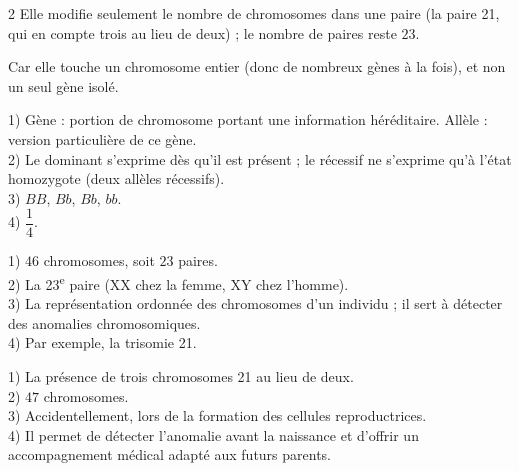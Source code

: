 \begin{multicols}{2}
Elle modifie seulement le nombre de chromosomes dans une paire (la paire 21, qui en
compte trois au lieu de deux) ; le nombre de paires reste $23$.

Car elle touche un chromosome entier (donc de nombreux gènes à la fois), et non un seul
gène isolé.

1) Gène : portion de chromosome portant une information héréditaire. Allèle : version
particulière de ce gène.\\
2) Le dominant s'exprime dès qu'il est présent ; le récessif ne s'exprime qu'à l'état
homozygote (deux allèles récessifs).\\
3) $BB$, $Bb$, $Bb$, $bb$.\\
4) $\dfrac14$.

1) $46$ chromosomes, soit $23$ paires.\\
2) La 23\textsuperscript{e} paire (XX chez la femme, XY chez l'homme).\\
3) La représentation ordonnée des chromosomes d'un individu ; il sert à détecter des
anomalies chromosomiques.\\
4) Par exemple, la trisomie 21.

1) La présence de trois chromosomes 21 au lieu de deux.\\
2) $47$ chromosomes.\\
3) Accidentellement, lors de la formation des cellules reproductrices.\\
4) Il permet de détecter l'anomalie avant la naissance et d'offrir un accompagnement
médical adapté aux futurs parents.

\end{multicols}
\exercicesBanner
